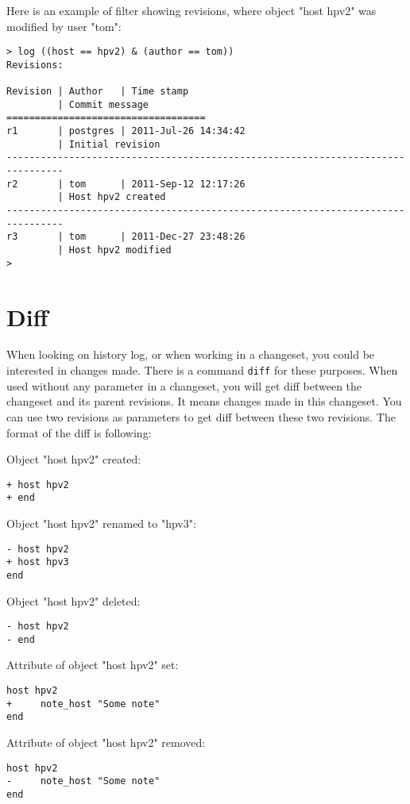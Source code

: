 \documentclass[deska]{subfiles}
\begin{document}
Here is an example of filter showing revisions, where object "host hpv2" was modified by user "tom":
\begin{verbatim}
> log ((host == hpv2) & (author == tom))
Revisions:

Revision | Author   | Time stamp                 
         | Commit message
===================================
r1       | postgres | 2011-Jul-26 14:34:42
         | Initial revision
--------------------------------------------------------------------------------
r2       | tom      | 2011-Sep-12 12:17:26
         | Host hpv2 created
--------------------------------------------------------------------------------
r3       | tom      | 2011-Dec-27 23:48:26
         | Host hpv2 modified
> 
\end{verbatim}

\section{Diff}

When looking on history log, or when working in a changeset, you could be interested in changes made. There is a command
{\tt diff} for these purposes. When used without any parameter in a changeset, you will get diff between the changeset and
its parent revisions. It means changes made in this changeset. You can use two revisions as parameters to get diff between
these two revisions. The format of the diff is following:

Object "host hpv2" created:

\begin{verbatim}
+ host hpv2
+ end
\end{verbatim}

Object "host hpv2" renamed to "hpv3":
\begin{verbatim}
- host hpv2
+ host hpv3
end
\end{verbatim}

Object "host hpv2" deleted:
\begin{verbatim}
- host hpv2
- end
\end{verbatim}

Attribute of object "host hpv2" set:
\begin{verbatim}
host hpv2
+     note_host "Some note"
end
\end{verbatim}

Attribute of object "host hpv2" removed:
\begin{verbatim}
host hpv2
-     note_host "Some note"
end
\end{verbatim}
\end{document}
